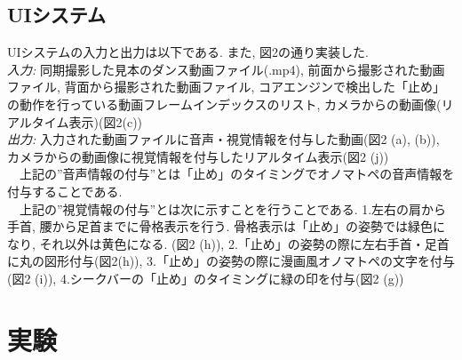 \documentclass[technicalreport]{ieicej}
\begin{document}
\subsection{UIシステム}
UIシステムの入力と出力は以下である. また, 図2の通り実装した. \\
\emph{入力: }同期撮影した見本のダンス動画ファイル(.mp4), 前面から撮影された動画ファイル, 背面から撮影された動画ファイル, コアエンジンで検出した「止め」の動作を行っている動画フレームインデックスのリスト, カメラからの動画像(リアルタイム表示)(図2(c))\\
\emph{出力: }入力された動画ファイルに音声・視覚情報を付与した動画(図2 (a), (b)), カメラからの動画像に視覚情報を付与したリアルタイム表示(図2 (j))\\
　上記の”音声情報の付与”とは「止め」のタイミングでオノマトペの音声情報を付与することである.\\
　上記の”視覚情報の付与”とは次に示すことを行うことである. 1.左右の肩から手首, 腰から足首までに骨格表示を行う. 骨格表示は「止め」の姿勢では緑色になり, それ以外は黄色になる. (図2 (h)), 2.「止め」の姿勢の際に左右手首・足首に丸の図形付与(図2(h)), 3.「止め」の姿勢の際に漫画風オノマトペの文字を付与(図2 (i)), 4.シークバーの「止め」のタイミングに緑の印を付与(図2 (g))
\section{実験}
\end{document}
